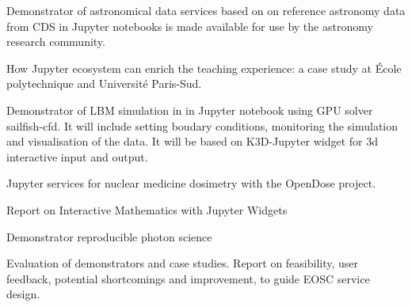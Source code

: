\begin{workpackage}
\begin{wpdelivs}

  \begin{wpdeliv}[due=42,miles=community,id=application-astro,dissem=PU,nature=DEM,lead=CDS]
    {Demonstrator of astronomical data services based on on reference astronomy
    data from CDS in Jupyter notebooks is made available for use by the
  astronomy research community.}
  \end{wpdeliv}

  \begin{wpdeliv}[due=48,miles=final,id=teaching,dissem=PU,nature=R,lead=EP]
    {How Jupyter ecosystem can enrich the teaching experience: a case study at
    \'Ecole polytechnique and Université Paris-Sud.}
  \end{wpdeliv}

  \begin{wpdeliv}[due=24,miles=final,id=lbm-jupyter,dissem=PU,nature=DEM,lead=SIL]
    { Demonstrator of LBM simulation in in Jupyter notebook using GPU solver
      sailfish-cfd. It will include setting boudary conditions, monitoring the
      simulation and visualisation of the data. It will be based on K3D-Jupyter
    widget for 3d interactive input and output.}
  \end{wpdeliv}

  \begin{wpdeliv}[due=36,miles=community,id=opendose-analysis,dissem=PU,nature=DEM,lead=INSERM]
    {Jupyter services for nuclear medicine dosimetry with the OpenDose project.}
  \end{wpdeliv}

  \begin{wpdeliv}[due=36,miles=final,id=math,dissem=PU,nature=R,lead=UPSUD]
    {Report on Interactive Mathematics with Jupyter Widgets}
  \end{wpdeliv}

  \begin{wpdeliv}[due=45,miles=final,id=xfel-workflows,dissem=PU,nature=DEM,lead=XFEL]
    {Demonstrator reproducible photon science}
  \end{wpdeliv}

  \begin{wpdeliv}[due=48,miles=final,id=applications-report,dissem=PU,nature=R,lead=XFEL]
    {Evaluation of demonstrators and case studies. Report on feasibility, user
      feedback, potential shortcomings and improvement, to guide EOSC service
    design.}
  \end{wpdeliv}

\end{wpdelivs}
\end{workpackage}

